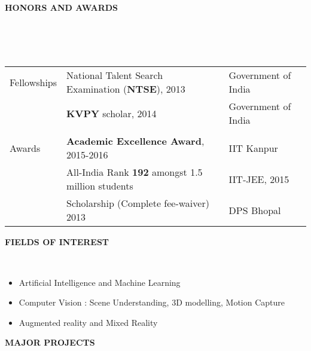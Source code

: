 \documentclass[a4paper,10pt]{article}
\newcommand{\lsep}{-0.5cm}
\newcommand{\resheading}[1]{{\small \colorbox{mygrey}{\begin{minipage}{0.975\textwidth}{\textbf{#1 \vphantom{p\^{E}}}}\end{minipage}}}}
\begin{document}
\resheading{\textbf{HONORS AND AWARDS} }\\[\lsep]
\\ \\
\indent \begin{tabular}{l@{\hskip 0.24in}| @{\hskip 0.1in} l @{\hskip 0.3in} l}
    Fellowships & National Talent Search Examination (\textbf{NTSE}), 2013 & Government of India\\
     &  \textbf{KVPY} scholar, 2014 & Government of India\\
     \\
     Awards & \textbf{Academic Excellence Award}, 2015-2016 & IIT Kanpur\\
     & All-India Rank \textbf{192} amongst 1.5 million students & IIT-JEE, 2015\\
     & Scholarship (Complete fee-waiver) 2013 & DPS Bhopal\\
\end{tabular}

\resheading{\textbf{FIELDS OF INTEREST} }\\[\lsep]
\begin{itemize}
\item Artificial Intelligence and Machine Learning
\item Computer Vision : Scene Understanding, 3D modelling, Motion Capture
\item Augmented reality and Mixed Reality
\end{itemize}

\resheading{\textbf{MAJOR PROJECTS} }\\[\lsep]
\end{document}
